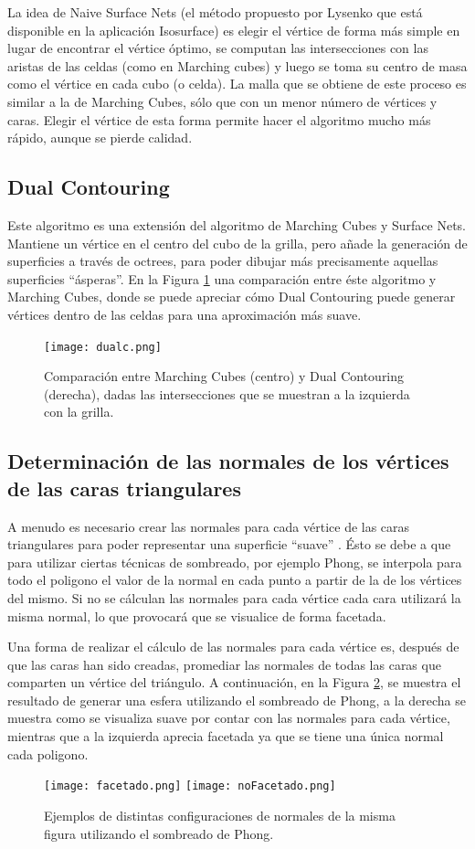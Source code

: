 \documentclass[12pt]{article}
\begin{document}
La idea de Naive Surface Nets (el método propuesto por Lysenko\cite{mykola2} que está disponible en la aplicación Isosurface) es elegir el vértice de forma más simple  en lugar de encontrar el vértice óptimo, se computan las intersecciones con las aristas de las celdas (como en Marching cubes) y luego se toma su centro de masa como el vértice en cada cubo (o celda). La malla que se obtiene de este proceso es similar a la de Marching Cubes, sólo que con un menor número de vértices y caras. Elegir el vértice de esta forma permite hacer el algoritmo mucho más rápido, aunque se pierde calidad.
\subsection{Dual Contouring}
\noindent Este algoritmo es una extensión del algoritmo de Marching Cubes y Surface Nets. Mantiene un vértice en el centro del cubo de la grilla, pero añade la generación de superficies a través de octrees, para poder dibujar más precisamente aquellas superficies “ásperas”\cite{dualcontour}. En la Figura \ref{dual} una comparación entre éste algoritmo y Marching Cubes, donde se puede apreciar cómo Dual Contouring puede generar vértices dentro de las celdas para una aproximación más suave.

\begin{figure}[h!]
\texttt{[image: dualc.png]}
\caption{ Comparación entre Marching Cubes (centro) y Dual Contouring (derecha), dadas las intersecciones que se muestran a la izquierda con la grilla.}
\label{dual}
\end{figure}

\subsection{Determinación de las normales de los vértices de las caras triangulares}
\noindent A menudo es necesario crear las normales para cada vértice de las caras triangulares para poder representar una superficie “suave” \cite{realtimerendering}. Ésto se debe a que para utilizar ciertas técnicas de sombreado, por ejemplo Phong, se interpola para todo el poligono el valor de la normal en cada punto a partir de la de los vértices del mismo. Si no se cálculan las normales para cada vértice cada cara utilizará la misma normal, lo que provocará que se visualice de forma facetada.

Una forma de realizar el cálculo de las normales para cada vértice es, después de que las caras han sido creadas, promediar las normales de todas las caras que comparten un vértice del triángulo. A continuación, en la Figura \ref{normales}, se muestra el resultado de generar una esfera utilizando el sombreado de Phong\cite{realtimerendering}, a la derecha se muestra como se visualiza suave por contar con las normales para cada vértice, mientras que a la izquierda aprecia facetada ya que se tiene una única normal cada poligono.
\begin{figure}[h]
\texttt{[image: facetado.png]}
\hfill
\texttt{[image: noFacetado.png]}
\caption{ Ejemplos de distintas configuraciones de normales de la misma figura utilizando el sombreado de Phong.}
\label{normales}
\end{figure}
\end{document}
